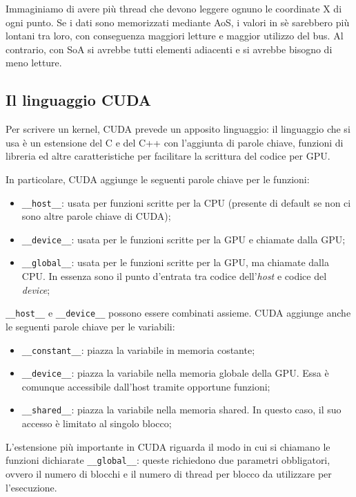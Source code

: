 \documentclass[12pt,a4paper,openright,twoside]{report}
\begin{document}
Immaginiamo di avere più thread che devono leggere ognuno le coordinate X di ogni punto. Se i dati sono memorizzati mediante AoS, i valori in sè sarebbero più lontani tra loro, con conseguenza maggiori letture e maggior utilizzo del bus. Al contrario, con SoA si avrebbe tutti elementi adiacenti e si avrebbe bisogno di meno letture.

\subsection{Il linguaggio CUDA}

Per scrivere un kernel, CUDA prevede un apposito linguaggio: il linguaggio che si usa è un estensione del C e del C++ con l'aggiunta di parole chiave, funzioni di libreria ed altre caratteristiche per facilitare la scrittura del codice per GPU.

In particolare, CUDA aggiunge le seguenti parole chiave per le funzioni:

\begin{itemize}
    \item \verb|__host__|: usata per funzioni scritte per la CPU (presente di default se non ci sono altre parole chiave di CUDA);
    \item \verb|__device__|: usata per le funzioni scritte per la GPU e chiamate dalla GPU;
    \item \verb|__global__|: usata per le funzioni scritte per la GPU, ma chiamate dalla CPU. In essenza sono il punto d'entrata tra codice dell'\textit{host} e codice del \textit{device};
\end{itemize}

\verb|__host__| e \verb|__device__| possono essere combinati assieme. CUDA aggiunge anche le seguenti parole chiave per le variabili:

\begin{itemize}
    \item \verb|__constant__|: piazza la variabile in memoria costante;
    \item \verb|__device__|: piazza la variabile nella memoria globale della GPU. Essa è comunque accessibile dall'host tramite opportune funzioni;
    \item \verb|__shared__|: piazza la variabile nella memoria shared. In questo caso, il suo accesso è limitato al singolo blocco;
\end{itemize}

L'estensione più importante in CUDA riguarda il modo in cui si chiamano le funzioni dichiarate \verb|__global__|: queste richiedono due parametri obbligatori, ovvero il numero di blocchi e il numero di thread per blocco da utilizzare per l'esecuzione.
\end{document}
